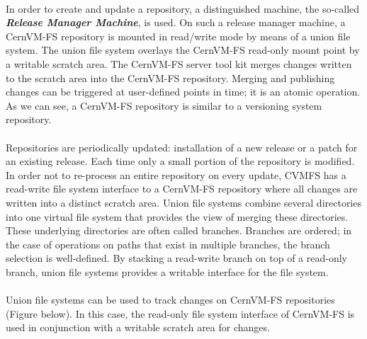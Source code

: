 \paragraph{}
In order to create and update a repository, a distinguished machine, the so-called \textit{\textbf{Release Manager Machine}}, is used. On such a release manager machine, a CernVM-FS repository is mounted in read/write mode by means of a union file system. The union file system overlays the CernVM-FS read-only mount point by a writable scratch area. The CernVM-FS server tool kit merges changes written to the scratch area into the CernVM-FS repository. Merging and publishing changes can be triggered at user-defined points in time; it is an atomic operation. As we can see, a CernVM-FS repository is similar to a versioning system repository.
\paragraph{}
Repositories are periodically updated: installation of a new release or a patch for an existing release. Each time only a small portion of the repository is modified. 
In order not to re-process an entire repository on every update, CVMFS has a read-write file system interface to a CernVM-FS repository where all changes are written into a distinct scratch area.
Union file systems combine several directories into one virtual file system that provides the view of merging these directories. These underlying directories are often called branches. Branches are ordered; in the case of operations on paths that exist in multiple branches, the branch selection is well-defined. By stacking a read-write branch on top of a read-only branch, union file systems provides a writable interface for the file system. 
\paragraph{}
Union file systems can be used to track changes on CernVM-FS repositories (Figure below). In this case, the read-only file system interface of CernVM-FS is used in conjunction with a writable scratch area for changes.

